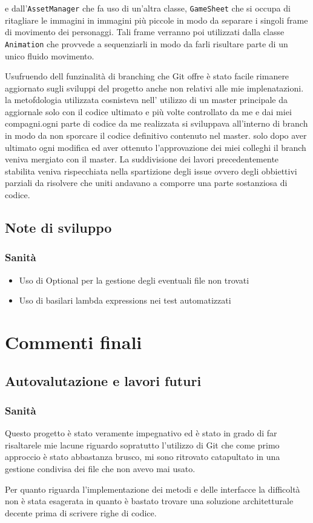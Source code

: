 \documentclass[a4paper,12pt]{report}
\begin{document}
    e dall’\texttt{AssetManager} che fa uso di un’altra classe, \texttt{GameSheet} che si occupa di ritagliare le immagini in immagini più piccole
    in modo da separare i singoli frame di movimento dei personaggi. Tali frame verranno poi utilizzati dalla classe \texttt{Animation} che
    provvede a sequenziarli in modo da farli risultare parte di un unico fluido movimento.
    \par Usufruendo dell funzinalità di branching che Git offre è stato facile rimanere aggiornato sugli sviluppi del progetto anche non
    relativi alle mie implenatazioni. la metofdologia utilizzata cosnisteva nell' utilizzo di un master principale da aggiornale solo con
    il codice ultimato e più volte controllato da me e dai miei compagni.ogni parte di codice da me realizzata si sviluppava all'interno di branch
    in modo da non sporcare il codice definitivo contenuto nel master. solo dopo aver ultimato ogni modifica ed aver ottenuto l'approvazione dei miei colleghi
    il branch veniva mergiato con il master.
    La suddivisione dei lavori precedentemente stabilita veniva rispecchiata nella spartizione degli issue ovvero degli obbiettivi parziali da risolvere che uniti
    andavano a comporre una parte sostanziosa di codice.
    \section{Note di sviluppo}
    \subsection{Sanità}
    \begin{itemize}
            \item Uso di Optional per la gestione degli eventuali file non trovati
            \item Uso di basilari lambda expressions nei test automatizzati
    \end{itemize}
    \chapter{Commenti finali}
    \section{Autovalutazione e lavori futuri}
    \subsection{Sanità}
    \par Questo progetto è stato veramente impegnativo ed è stato in grado di far risaltarele mie lacune riguardo sopratutto l'utilizzo di Git che come
    primo approccio è stato abbastanza brusco, mi sono ritrovato catapultato in una gestione condivisa dei file che non avevo mai usato.
    \par Per quanto riguarda l'implementazione dei metodi e delle interfacce la difficoltà non è stata esagerata in quanto è bastato trovare una soluzione
    architetturale decente prima di scrivere righe di codice.
\end{document}
